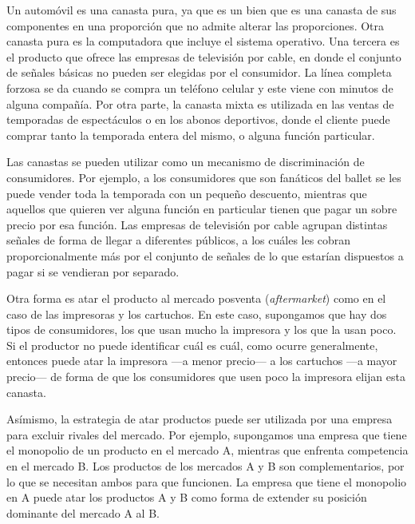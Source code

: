 \documentclass[
  12pt,
  spanish,
]{book}
\begin{document}
Un automóvil es una canasta pura, ya que es un bien que es una canasta de sus componentes en una proporción que no admite alterar las proporciones. Otra canasta pura es la computadora que incluye el sistema operativo. Una tercera es el producto que ofrece las empresas de televisión por cable, en donde el conjunto de señales básicas no pueden ser elegidas por el consumidor. La línea completa forzosa se da cuando se compra un teléfono celular y este viene con minutos de alguna compañía. Por otra parte, la canasta mixta es utilizada en las ventas de temporadas de espectáculos o en los abonos deportivos, donde el cliente puede comprar tanto la temporada entera del mismo, o alguna función particular.

Las canastas se pueden utilizar como un mecanismo de discriminación de consumidores. Por ejemplo, a los consumidores que son fanáticos del ballet se les puede vender toda la temporada con un pequeño descuento, mientras que aquellos que quieren ver alguna función en particular tienen que pagar un sobre precio por esa función. Las empresas de televisión por cable agrupan distintas señales de forma de llegar a diferentes públicos, a los cuáles les cobran proporcionalmente más por el conjunto de señales de lo que estarían dispuestos a pagar si se vendieran por separado.

Otra forma es atar el producto al mercado posventa (\emph{aftermarket}) como en el caso de las impresoras y los cartuchos. En este caso, supongamos que hay dos tipos de consumidores, los que usan mucho la impresora y los que la usan poco. Si el productor no puede identificar cuál es cuál, como ocurre generalmente, entonces puede atar la impresora ---a menor precio--- a los cartuchos ---a mayor precio--- de forma de que los consumidores que usen poco la impresora elijan esta canasta.

Asímismo, la estrategia de atar productos puede ser utilizada por una empresa para excluir rivales del mercado. Por ejemplo, supongamos una empresa que tiene el monopolio de un producto en el mercado A, mientras que enfrenta competencia en el mercado B. Los productos de los mercados A y B son complementarios, por lo que se necesitan ambos para que funcionen. La empresa que tiene el monopolio en A puede atar los productos A y B como forma de extender su posición dominante del mercado A al B.
\end{document}
